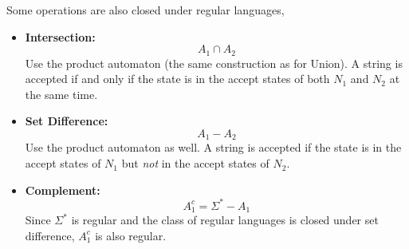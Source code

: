 \begin{note}
    Some operations are also closed under regular languages,
    \begin{itemize}[label=$\circ$]
        \item \textbf{Intersection:}
        \[
            A_1 \cap A_2
        \]
        Use the product automaton (the same construction as for Union).
        A string is accepted if and only if the state is in the accept states of both $N_1$ and $N_2$ at the same time.

        \item \textbf{Set Difference:}
        \[
            A_1 - A_2
        \]
        Use the product automaton as well.
        A string is accepted if the state is in the accept states of $N_1$ but \emph{not} in the accept states of $N_2$.

        \item \textbf{Complement:}
        \[
            A_1^c = \Sigma^* - A_1
        \]
        Since $\Sigma^*$ is regular and the class of regular languages is closed under set difference,
        $A_1^c$ is also regular.
    \end{itemize} 
\end{note}